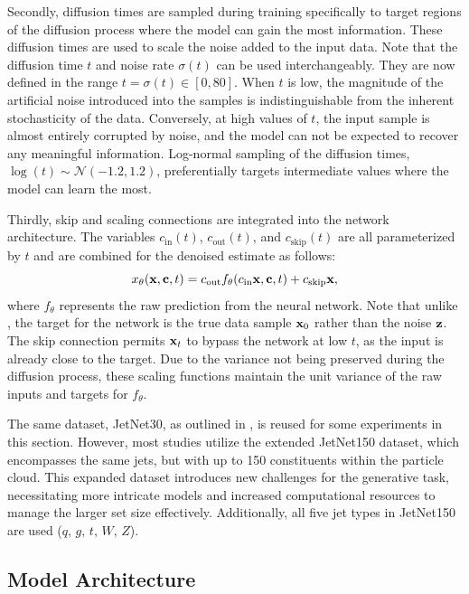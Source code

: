 Secondly, diffusion times are sampled during training specifically to target regions of the diffusion process where the model can gain the most information.
These diffusion times are used to scale the noise added to the input data.
Note that the diffusion time $t$ and noise rate $\sigma(t)$ can be used interchangeably.
They are now defined in the range $t = \sigma(t) \in [0, 80]$.
When $t$ is low, the magnitude of the artificial noise introduced into the samples is indistinguishable from the inherent stochasticity of the data.
Conversely, at high values of $t$, the input sample is almost entirely corrupted by noise, and the model can not be expected to recover any meaningful information.
Log-normal sampling of the diffusion times, ${\log(t)\sim\mathcal{N}\left(-1.2, 1.2\right)}$, preferentially targets intermediate values where the model can learn the most.

Thirdly, skip and scaling connections are integrated into the network architecture.
The variables $c_\mathrm{in}(t)$, $c_\mathrm{out}(t)$, and $c_\mathrm{skip}(t)$ are all parameterized by $t$ and are combined for the denoised estimate as follows:
\begin{equation}
    x_\theta(\mathbf{x}, \mathbf{c}, t) = c_\mathrm{out} f_\theta(c_\mathrm{in}\mathbf{x}, \mathbf{c}, t) + c_\mathrm{skip}\mathbf{x},
\end{equation}
where $f_\theta$ represents the raw prediction from the neural network.
Note that unlike \pcjedi, the target for the network is the true data sample $\mathbf{x}_0$ rather than the noise $\mathbf{z}$.
The skip connection permits $\mathbf{x}_t$ to bypass the network at low $t$, as the input is already close to the target.
Due to the variance not being preserved during the diffusion process, these scaling functions maintain the unit variance of the raw inputs and targets
for $f_\theta$.

The same dataset, JetNet30, as outlined in , is reused for some experiments in this section.
However, most studies utilize the extended JetNet150 dataset, which encompasses the same jets, but with up to 150 constituents within the particle cloud.
This expanded dataset introduces new challenges for the generative task, necessitating more intricate models and increased computational resources to manage the larger set size effectively.
Additionally, all five jet types in JetNet150 are used ($q,\,g,\,t,\,W,\,Z$).

\subsection{Model Architecture}


